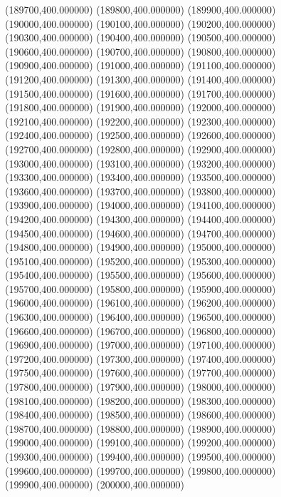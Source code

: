 (189700,400.000000)
(189800,400.000000)
(189900,400.000000)
(190000,400.000000)
(190100,400.000000)
(190200,400.000000)
(190300,400.000000)
(190400,400.000000)
(190500,400.000000)
(190600,400.000000)
(190700,400.000000)
(190800,400.000000)
(190900,400.000000)
(191000,400.000000)
(191100,400.000000)
(191200,400.000000)
(191300,400.000000)
(191400,400.000000)
(191500,400.000000)
(191600,400.000000)
(191700,400.000000)
(191800,400.000000)
(191900,400.000000)
(192000,400.000000)
(192100,400.000000)
(192200,400.000000)
(192300,400.000000)
(192400,400.000000)
(192500,400.000000)
(192600,400.000000)
(192700,400.000000)
(192800,400.000000)
(192900,400.000000)
(193000,400.000000)
(193100,400.000000)
(193200,400.000000)
(193300,400.000000)
(193400,400.000000)
(193500,400.000000)
(193600,400.000000)
(193700,400.000000)
(193800,400.000000)
(193900,400.000000)
(194000,400.000000)
(194100,400.000000)
(194200,400.000000)
(194300,400.000000)
(194400,400.000000)
(194500,400.000000)
(194600,400.000000)
(194700,400.000000)
(194800,400.000000)
(194900,400.000000)
(195000,400.000000)
(195100,400.000000)
(195200,400.000000)
(195300,400.000000)
(195400,400.000000)
(195500,400.000000)
(195600,400.000000)
(195700,400.000000)
(195800,400.000000)
(195900,400.000000)
(196000,400.000000)
(196100,400.000000)
(196200,400.000000)
(196300,400.000000)
(196400,400.000000)
(196500,400.000000)
(196600,400.000000)
(196700,400.000000)
(196800,400.000000)
(196900,400.000000)
(197000,400.000000)
(197100,400.000000)
(197200,400.000000)
(197300,400.000000)
(197400,400.000000)
(197500,400.000000)
(197600,400.000000)
(197700,400.000000)
(197800,400.000000)
(197900,400.000000)
(198000,400.000000)
(198100,400.000000)
(198200,400.000000)
(198300,400.000000)
(198400,400.000000)
(198500,400.000000)
(198600,400.000000)
(198700,400.000000)
(198800,400.000000)
(198900,400.000000)
(199000,400.000000)
(199100,400.000000)
(199200,400.000000)
(199300,400.000000)
(199400,400.000000)
(199500,400.000000)
(199600,400.000000)
(199700,400.000000)
(199800,400.000000)
(199900,400.000000)
(200000,400.000000)
